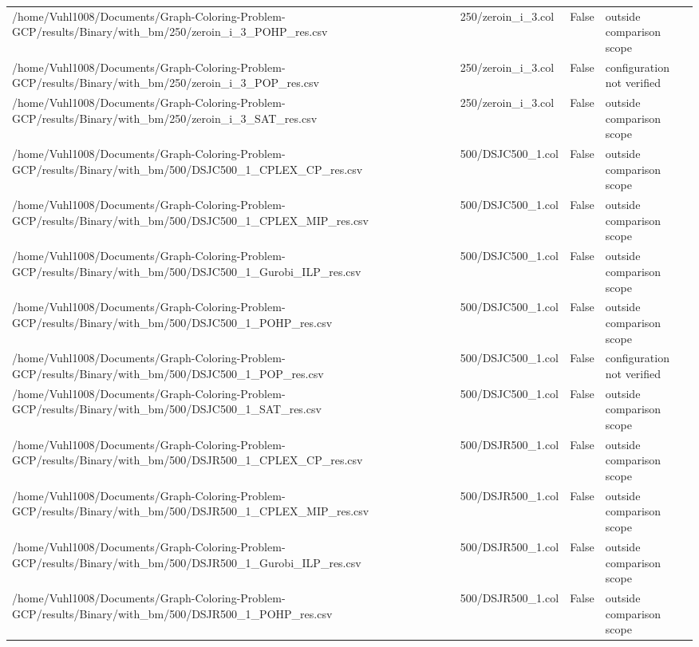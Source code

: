 \begin{table}[htbp]
\begin{tabular}{llll}
/home/Vuhl1008/Documents/Graph-Coloring-Problem-GCP/results/Binary/with\_bm/250/zeroin\_i\_3\_POHP\_res.csv & 250/zeroin\_i\_3.col & False & outside comparison scope \\
/home/Vuhl1008/Documents/Graph-Coloring-Problem-GCP/results/Binary/with\_bm/250/zeroin\_i\_3\_POP\_res.csv & 250/zeroin\_i\_3.col & False & configuration not verified \\
/home/Vuhl1008/Documents/Graph-Coloring-Problem-GCP/results/Binary/with\_bm/250/zeroin\_i\_3\_SAT\_res.csv & 250/zeroin\_i\_3.col & False & outside comparison scope \\
/home/Vuhl1008/Documents/Graph-Coloring-Problem-GCP/results/Binary/with\_bm/500/DSJC500\_1\_CPLEX\_CP\_res.csv & 500/DSJC500\_1.col & False & outside comparison scope \\
/home/Vuhl1008/Documents/Graph-Coloring-Problem-GCP/results/Binary/with\_bm/500/DSJC500\_1\_CPLEX\_MIP\_res.csv & 500/DSJC500\_1.col & False & outside comparison scope \\
/home/Vuhl1008/Documents/Graph-Coloring-Problem-GCP/results/Binary/with\_bm/500/DSJC500\_1\_Gurobi\_ILP\_res.csv & 500/DSJC500\_1.col & False & outside comparison scope \\
/home/Vuhl1008/Documents/Graph-Coloring-Problem-GCP/results/Binary/with\_bm/500/DSJC500\_1\_POHP\_res.csv & 500/DSJC500\_1.col & False & outside comparison scope \\
/home/Vuhl1008/Documents/Graph-Coloring-Problem-GCP/results/Binary/with\_bm/500/DSJC500\_1\_POP\_res.csv & 500/DSJC500\_1.col & False & configuration not verified \\
/home/Vuhl1008/Documents/Graph-Coloring-Problem-GCP/results/Binary/with\_bm/500/DSJC500\_1\_SAT\_res.csv & 500/DSJC500\_1.col & False & outside comparison scope \\
/home/Vuhl1008/Documents/Graph-Coloring-Problem-GCP/results/Binary/with\_bm/500/DSJR500\_1\_CPLEX\_CP\_res.csv & 500/DSJR500\_1.col & False & outside comparison scope \\
/home/Vuhl1008/Documents/Graph-Coloring-Problem-GCP/results/Binary/with\_bm/500/DSJR500\_1\_CPLEX\_MIP\_res.csv & 500/DSJR500\_1.col & False & outside comparison scope \\
/home/Vuhl1008/Documents/Graph-Coloring-Problem-GCP/results/Binary/with\_bm/500/DSJR500\_1\_Gurobi\_ILP\_res.csv & 500/DSJR500\_1.col & False & outside comparison scope \\
/home/Vuhl1008/Documents/Graph-Coloring-Problem-GCP/results/Binary/with\_bm/500/DSJR500\_1\_POHP\_res.csv & 500/DSJR500\_1.col & False & outside comparison scope \\

\end{tabular}
\end{table}
